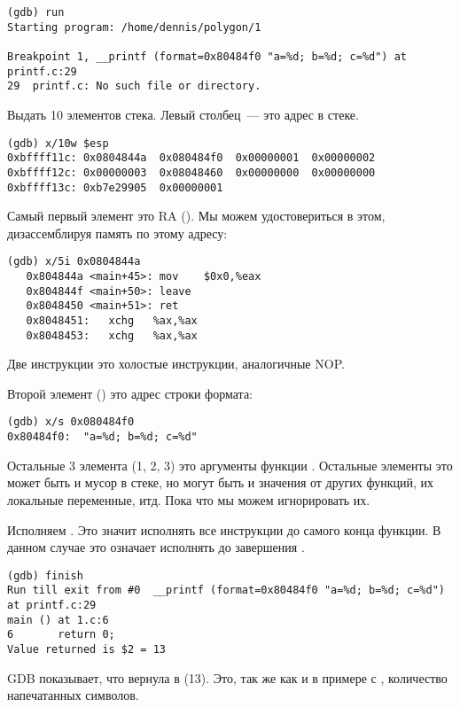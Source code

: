 \begin{lstlisting}
(gdb) run
Starting program: /home/dennis/polygon/1 

Breakpoint 1, __printf (format=0x80484f0 "a=%d; b=%d; c=%d") at printf.c:29
29	printf.c: No such file or directory.
\end{lstlisting}

Выдать 10 элементов стека. Левый столбец~--- это адрес в стеке.

\begin{lstlisting}
(gdb) x/10w $esp
0xbffff11c:	0x0804844a	0x080484f0	0x00000001	0x00000002
0xbffff12c:	0x00000003	0x08048460	0x00000000	0x00000000
0xbffff13c:	0xb7e29905	0x00000001
\end{lstlisting}

Самый первый элемент это \ac{RA} ().
Мы можем удостовериться в этом, дизассемблируя память по этому адресу:

\begin{lstlisting}[label=NOP_as_XCHG_example]
(gdb) x/5i 0x0804844a
   0x804844a <main+45>:	mov    $0x0,%eax
   0x804844f <main+50>:	leave  
   0x8048450 <main+51>:	ret    
   0x8048451:	xchg   %ax,%ax
   0x8048453:	xchg   %ax,%ax
\end{lstlisting}

Две инструкции  это холостые инструкции, аналогичные \ac{NOP}.

Второй элемент () это адрес строки формата:

\begin{lstlisting}
(gdb) x/s 0x080484f0
0x80484f0:	"a=%d; b=%d; c=%d"
\end{lstlisting}

Остальные 3 элемента (1, 2, 3) это аргументы функции \printf.
Остальные элементы это может быть и мусор в стеке, но могут быть и значения
от других функций, их локальные переменные, итд.
Пока что мы можем игнорировать их.

Исполняем . 
Это значит исполнять все инструкции до самого конца функции. 
В данном случае это означает исполнять до завершения \printf.

\begin{lstlisting}
(gdb) finish
Run till exit from #0  __printf (format=0x80484f0 "a=%d; b=%d; c=%d") at printf.c:29
main () at 1.c:6
6		return 0;
Value returned is $2 = 13
\end{lstlisting}

\ac{GDB} показывает, что вернула \printf в \EAX (13).
Это, так же как и в примере с \olly, количество напечатанных символов.

